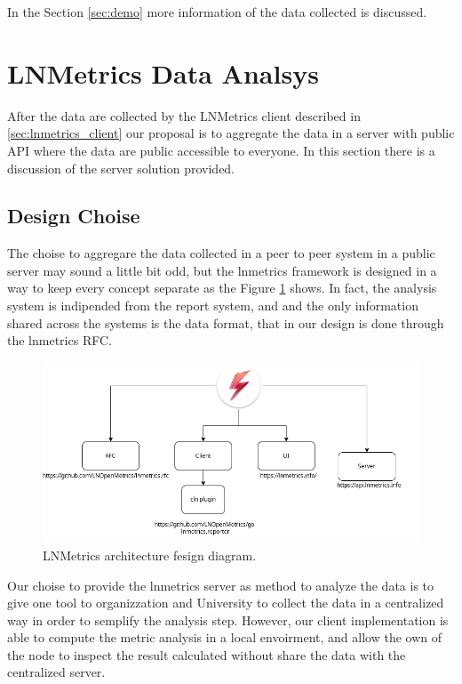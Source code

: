 In the Section \ref{sec:demo} more information of the data collected is discussed.

\section{LNMetrics Data Analsys}
\label{sec:lnmetrics_server}

After the data are collected by the LNMetrics client described in \ref{sec:lnmetrics_client}
our proposal is to aggregate the data in a server with public API where the data are 
public accessible to everyone. In this section there is a discussion of 
the server solution provided.

\subsection{Design Choise}

The choise to aggregare the data collected in a peer to peer system in a public 
server may sound a little bit odd, but the lnmetrics framework is designed in a 
way to keep every concept separate as the Figure \ref{fig:lnmetrics_architecture} 
shows. In fact, the analysis system is indipended from the report system, and 
and the only information shared across the systems is the data format, 
that in our design is done through the lnmetrics RFC.

\begin{figure}
    \begin{center}
    \includegraphics[scale=0.5]{imgs/lnmetrics-architecture.drawio.png}
    \end{center}
    \caption{LNMetrics architecture fesign diagram.}
    \label{fig:lnmetrics_architecture}
\end{figure}

Our choise to provide the lnmetrics server as method to analyze the data is to 
give one tool to organizzation and University to collect the data in a centralized
way in order to semplify the analysis step. However, our client implementation is able
to compute the metric analysis in a local envoirment, and allow the own
of the node to inspect the result calculated without share the data with the centralized
server.


